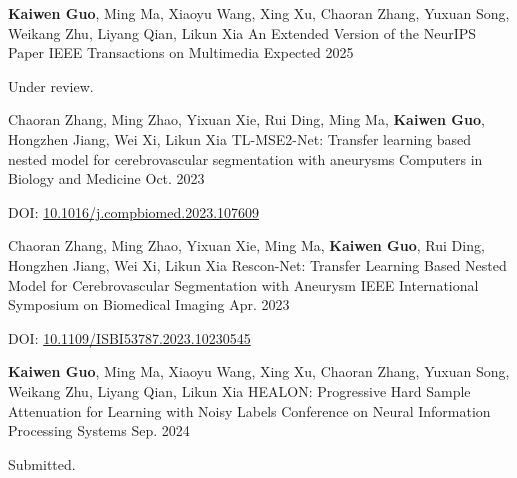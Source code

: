 

\begin{cventries}

  \cventry
  {\textbf{Kaiwen Guo}, Ming Ma, Xiaoyu Wang, Xing Xu, Chaoran Zhang, Yuxuan Song, Weikang Zhu, Liyang Qian, Likun Xia} %
  {An Extended Version of the NeurIPS Paper} %
  {IEEE Transactions on Multimedia} %
  {Expected 2025} %
  {
    \begin{cvitems}
      \item{Under review.}
    \end{cvitems}
  }

  \cventry
  {Chaoran Zhang, Ming Zhao, Yixuan Xie, Rui Ding, Ming Ma, \textbf{Kaiwen Guo}, Hongzhen Jiang, Wei Xi, Likun Xia} %
  {TL-MSE2-Net: Transfer learning based nested model for cerebrovascular segmentation with aneurysms} %
  {Computers in Biology and Medicine} %
  {Oct. 2023} %
  {
    \begin{cvitems}
      \item{DOI: \href{https://doi.org/10.1016/j.compbiomed.2023.107609}{10.1016/j.compbiomed.2023.107609}}
    \end{cvitems}
  }

  \cventry
  {Chaoran Zhang, Ming Zhao, Yixuan Xie, Ming Ma, \textbf{Kaiwen Guo}, Rui Ding, Hongzhen Jiang, Wei Xi, Likun Xia} %
  {Rescon-Net: Transfer Learning Based Nested Model for Cerebrovascular Segmentation with Aneurysm} %
  {IEEE International Symposium on Biomedical Imaging} %
  {Apr. 2023} %
  {
    \begin{cvitems}
      \item{DOI: \href{https://doi.org/10.1109/ISBI53787.2023.10230545}{10.1109/ISBI53787.2023.10230545}}
    \end{cvitems}
  }



  \cventry
  {\textbf{Kaiwen Guo}, Ming Ma, Xiaoyu Wang, Xing Xu, Chaoran Zhang, Yuxuan Song, Weikang Zhu, Liyang Qian, Likun Xia} %
  {HEALON: Progressive Hard Sample Attenuation for Learning with Noisy Labels} %
  {Conference on Neural Information Processing Systems} %
  {Sep. 2024} %
  {
    \begin{cvitems}
      \item{Submitted.}
    \end{cvitems}
  }


\end{cventries}



